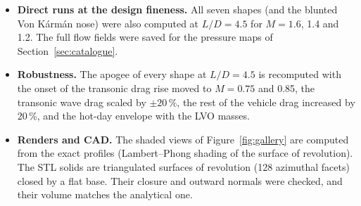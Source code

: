 \begin{itemize}[leftmargin=*,itemsep=2pt]
\item \textbf{Direct runs at the design fineness.} All seven shapes (and the blunted Von K\'arm\'an
nose) were also computed at $L/D = 4.5$ for $M = 1.6$, 1.4 and 1.2. The full flow fields were saved
for the pressure maps of Section~\ref{sec:catalogue}.
\item \textbf{Robustness.} The apogee of every shape at $L/D = 4.5$ is recomputed with the onset of
the transonic drag rise moved to $M = 0.75$ and 0.85, the transonic wave drag scaled by
$\pm20\,\%$, the rest of the vehicle drag increased by 20\,\%, and the hot-day envelope with the LVO
masses.
\item \textbf{Renders and CAD.} The shaded views of Figure~\ref{fig:gallery} are computed from the
exact profiles (Lambert--Phong shading of the surface of revolution). The STL solids are
triangulated surfaces of revolution (128 azimuthal facets) closed by a flat base. Their
closure and outward normals were checked, and their volume matches the analytical one.
\end{itemize}
